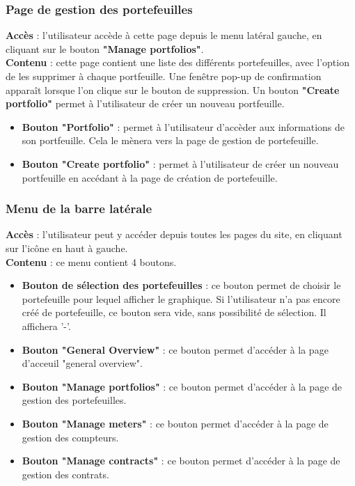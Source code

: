 \documentclass[../rapport.tex]{subfiles}
\begin{document}
\subsubsection{Page de gestion des portefeuilles}
\noindent \textbf{Accès} : l'utilisateur accède à cette page depuis le menu latéral gauche, en cliquant sur le bouton \textbf{"Manage portfolios"}. \\
\textbf{Contenu} : cette page contient une liste des différents portefeuilles, avec l'option de les supprimer à chaque portfeuille. Une fenêtre pop-up de confirmation apparaît lorsque l'on clique sur le bouton de suppression. Un bouton \textbf{"Create portfolio"} permet à l'utilisateur de créer un nouveau portfeuille. 
\begin{itemize}
    \item \textbf{Bouton "Portfolio"} : permet à l'utilisateur d'accèder aux informations de son portfeuille. Cela le mènera vers la page de gestion de portefeuille. 
    \item \textbf{Bouton "Create portfolio"} : permet à l'utilisateur de créer un nouveau portfeuille en accédant à la page de création de portefeuille.
\end{itemize}

\subsubsection{Menu de la barre latérale}
\noindent \textbf{Accès} : l'utilisateur peut y accéder depuis toutes les pages du site, en cliquant sur l'icône en haut à gauche.\\
\textbf{Contenu} : ce menu contient 4 boutons. 
\begin{itemize}
    \item \textbf{Bouton de sélection des portefeuilles} : ce bouton permet de choisir le portefeuille pour lequel afficher le graphique. Si l'utilisateur n'a pas encore créé de portefeuille, ce bouton sera vide, sans possibilité de sélection. Il affichera '-'.
    \item \textbf{Bouton "General Overview"} : ce bouton permet d'accéder à la page d'acceuil "general overview".
    \item \textbf{Bouton "Manage portfolios"} : ce bouton permet d'accéder à la page de gestion des portefeuilles.
    \item \textbf{Bouton "Manage meters"} : ce bouton permet d'accéder à la page de gestion des compteurs.
    \item \textbf{Bouton "Manage contracts"} : ce bouton permet d'accéder à la page de gestion des contrats.
\end{itemize}
\end{document}
